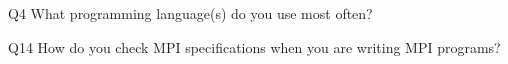 \begin{description}%
\item{Q4} What programming language(s) do you use most often?%
\item{Q14} How do you check MPI specifications when you are writing MPI programs?%
\end{description}%
